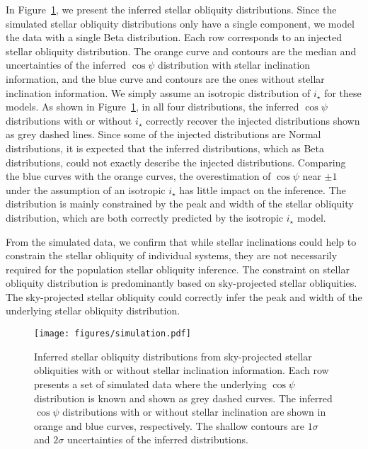 \documentclass[twocolumn,times]{aastex631}
\begin{document}
In Figure~\ref{fig:simulation}, we present the inferred stellar obliquity distributions. Since the simulated stellar obliquity distributions only have a single component, we model the data with a single Beta distribution. Each row corresponds to an injected stellar obliquity distribution. The orange curve and contours are the median and uncertainties of the inferred $\cos{\psi}$ distribution with stellar inclination information, and the blue curve and contours are the ones without stellar inclination information. We simply assume an isotropic distribution of $i_\star$ for these models.
As shown in Figure~\ref{fig:simulation}, in all four distributions, the inferred $\cos{\psi}$ distributions with or without $i_\star$ correctly recover the injected distributions shown as grey dashed lines. Since some of the injected distributions are Normal distributions, it is expected that the inferred distributions, which as Beta distributions, could not exactly describe the injected distributions.
Comparing the blue curves with the orange curves, the overestimation of $\cos{\psi}$ near $\pm1$ under the assumption of an isotropic $i_\star$ has little impact on the inference. The distribution is mainly constrained by the peak and width of the stellar obliquity distribution, which are both correctly predicted by the isotropic $i_\star$ model.

From the simulated data, we confirm that while stellar inclinations could help to constrain the stellar obliquity of individual systems, they are not necessarily required for the population stellar obliquity inference. The constraint on stellar obliquity distribution is predominantly based on sky-projected stellar obliquities. The sky-projected stellar obliquity could correctly infer the peak and width of the underlying stellar obliquity distribution.

\begin{figure}[ht!]
    \texttt{[image: figures/simulation.pdf]}
    \caption{Inferred stellar obliquity distributions from sky-projected stellar obliquities with or without stellar inclination information. Each row presents a set of simulated data where the underlying $\cos{\psi}$ distribution is known and shown as grey dashed curves. The inferred $\cos{\psi}$ distributions with or without stellar inclination are shown in orange and blue curves, respectively. The shallow contours are $1\sigma$ and $2\sigma$ uncertainties of the inferred distributions.}
    \label{fig:simulation}
\end{figure}
\end{document}
